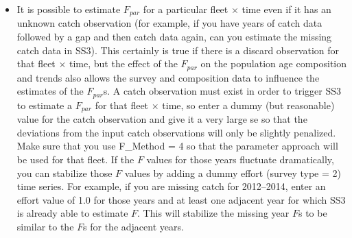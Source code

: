 \begin{itemize}
	\item It is possible to estimate $F_{par}$ for a particular fleet $\times$ time even if it has an unknown catch observation (for example, if you have years of catch data followed by a gap and then catch data again, can you estimate the missing catch data in SS3). This certainly is true if there is a discard observation for that fleet $\times$ time, but the effect of the $F_{par}$ on the population age composition and trends also allows the survey and composition data to influence the estimates of the $F_{par}$s. A catch observation must exist in order to trigger SS3 to estimate a $F_{par}$ for that fleet $\times$ time, so enter a dummy (but reasonable) value for the catch observation and give it a very large \gls{se} so that the deviations from the input catch observations will only be slightly penalized. Make sure that you use F\_Method = 4 so that the parameter approach will be used for that fleet. If the $F$ values for those years fluctuate dramatically, you can stabilize those $F$ values by adding a dummy effort (survey type = 2) time series. For example, if you are missing catch for 2012--2014, enter an effort value of 1.0 for those years and at least one adjacent year for which SS3 is already able to estimate $F$. This will stabilize the missing year $F$s to be similar to the $F$s for the adjacent years.
\end{itemize}


